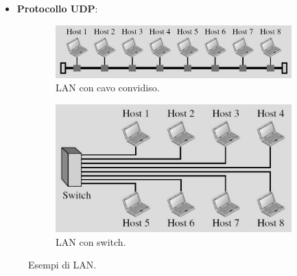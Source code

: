 \documentclass[11pt, italian, openany]{book}
\begin{document}
\begin{sloppypar}
\begin{itemize}[topsep=0pt, itemsep=0pt, parsep=0pt]
\begin{itemize}[topsep=0pt, itemsep=0pt, parsep=0pt]
		Si implementa inoltre lo stato di ``half-close'': uno dei due processi smette di inviare dati mentre ne sta ancora ricevendo; si veda in proposito
		la figura \ref{fig:tcp-half-close}.
		
		Per alcuni esempi, si vedano le figure \ref{fig:chiusura-3way}, \ref{fig:tcp-apertura-chiusura} e \ref{fig:tcp-chiusura}.
	\end{itemize}

	Durante una connessione TCP vengono attraversati pi\`u stati dai dispositivi terminali, tra questi si menziona lo stato \textbf{TIME}:
	indica che il dispositivo si trova adesso in attesa per un periodo di tempo lungo due volte la ``Maximum Segment Lifetime" in modo tale da assicurarsi che
	l'altro endpoint abbia riconosciuto la richiesta di chiusura della connessione; questo stato viene utilizzato per consentire l'eliminazione di segmenti
	duplicati in rete e implementare in maniera affidabile la terminazione della connessione in entrambe le direzioni.

	\item \textbf{Protocollo UDP}:
\end{itemize}

\pagebreak

\begin{figure}[h!]
	\begin{subfigure}[t]{0.49 \linewidth} \centering
		\includegraphics[scale=0.35]{images/lan-obsoleta.png}
		\caption{LAN con cavo convidiso.}
	\end{subfigure}
	\begin{subfigure}[t]{0.49 \linewidth} \centering
		\includegraphics[scale=0.4]{images/lan-moderna.png}
		\caption{LAN con switch.}
	\end{subfigure}
	\caption{Esempi di LAN.}
	\label{fig:LAN}
\end{figure}


\end{sloppypar}
\end{document}
